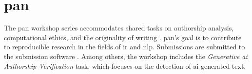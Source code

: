 \section{\acs{pan}}
\label{sec:pan}

The \ac{pan} workshop series accommodates shared tasks %
on authorship analysis, computational ethics, and the originality of writing \cite{ayele_overview_2024}.
\ac{pan}'s goal is to contribute to reproducible research in the fields of \ac{ir} and \ac{nlp}.
Submissions are submitted to the submission software \tira{}.
Among others, the workshop includes the \textit{Generative \ac{ai} Authorship Verification} task, 
which focuses on the detection of \ac{ai}-generated text.
